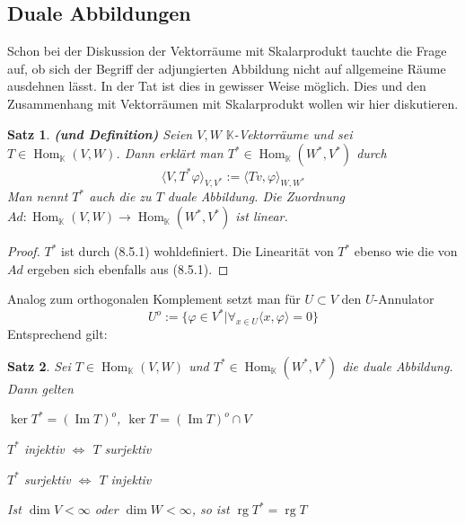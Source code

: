 \documentclass[12pt,a4paper]{article}
\newtheorem{theorem}{Satz}
\theoremstyle{definition}
\theoremstyle{remark}
\DeclareMathOperator{\Hom}{Hom}
\DeclareMathOperator{\Img}{Im}
\DeclareMathOperator{\rg}{rg}
\begin{document}
	\subsection{Duale Abbildungen}
	Schon bei der Diskussion der Vektorräume mit Skalarprodukt tauchte die Frage auf, ob sich der Begriff der adjungierten Abbildung nicht auf allgemeine Räume ausdehnen lässt. In der Tat ist dies in gewisser Weise möglich. Dies und den Zusammenhang mit Vektorräumen mit Skalarprodukt wollen wir hier diskutieren. \\
	\begin{theorem}{\textbf{(und Definition)}}
		Seien $V,W$ $\mathbb{K}$-Vektorräume und sei $T \in \Hom_{\mathbb{K}}(V,W)$. Dann erklärt man $T^* \in \Hom_{\mathbb{K}}(W^*,V^*)$ durch
		\begin{equation}
			\langle V, T^* \varphi \rangle_{V, V^*} := \langle Tv, \varphi \rangle_{W, W^*}
		\end{equation}
		Man nennt $T^*$ auch die zu $T$ duale Abbildung. Die Zuordnung $Ad: \Hom_{\mathbb{K}}(V,W) \rightarrow \Hom_{\mathbb{K}}(W^*,V^*)$ ist linear.
	\end{theorem}
	\begin{proof}
		$T^*$ ist durch (8.5.1) wohldefiniert. Die Linearität von $T^*$ ebenso wie die von $Ad$ ergeben sich ebenfalls aus (8.5.1).
	\end{proof}
	Analog zum orthogonalen Komplement setzt man für $U \subset V$ den $U$-Annulator
	\begin{equation}
		U^o := \{ \varphi \in V^* | \forall_{x \in U} \langle x, \varphi \rangle = 0 \}
	\end{equation}
	Entsprechend gilt:
	\begin{theorem}
		Sei $T \in \Hom_{\mathbb{K}}(V, W)$ und $T^* \in \Hom_{\mathbb{K}}(W^*,V^*)$ die duale Abbildung. Dann gelten
		\begin{proofenum}
			\item 	
				$\ker T^* = (\Img T)^o$, $\ker T = (\Img T)^o \cap V$
			\item 
				$T^*$ injektiv $\Leftrightarrow$ $T$ surjektiv
			\item 
				$T^*$ surjektiv $\Leftrightarrow$ $T$ injektiv
			\item 
				Ist $\dim V < \infty$ oder $\dim W < \infty$, so ist $\rg T^* = \rg T$
		\end{proofenum}
	\end{theorem}
\end{document}
